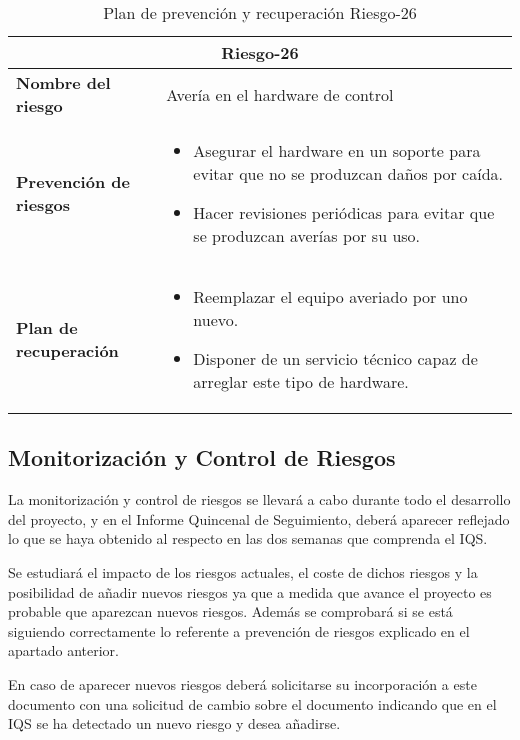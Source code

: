 \begin{table}[H]
\begin{center}
\begin{tabular}{p{} p{10cm}}
\multicolumn{2}{c}{\textbf{Riesgo-26} } \\
\hline \hline
\textbf{Nombre del riesgo} & Avería en el hardware de control \\
\hline
\textbf{Prevención de riesgos} & \begin{itemize}[-]
  \item Asegurar el hardware en un soporte para evitar que no se produzcan daños por caída.
  \item Hacer revisiones periódicas para evitar que se produzcan averías por su uso.
  \end{itemize} \\
\hline
\textbf{Plan de recuperación} &   \begin{itemize}[-]
  \item Reemplazar el equipo averiado por uno nuevo.
  \item Disponer de un servicio técnico capaz de arreglar este tipo de hardware.
  \end{itemize}\\
\hline
\end{tabular}
\caption{Plan de prevención y recuperación Riesgo-26}
\label{tab:Riesgo-26-Prev_Recup}
\end{center}
\end{table}


\subsection{Monitorización y Control de Riesgos}
\par La monitorización y control de riesgos se llevará a cabo durante todo el desarrollo del proyecto, y en el Informe Quincenal de Seguimiento, deberá aparecer reflejado lo que se haya obtenido al respecto en las dos semanas que comprenda el IQS.

Se estudiará el impacto de los riesgos actuales, el coste de dichos riesgos y la posibilidad de añadir nuevos riesgos ya que a medida que avance el proyecto es probable que aparezcan nuevos riesgos. Además se comprobará si se está siguiendo correctamente lo referente a prevención de riesgos explicado en el apartado anterior.

En caso de aparecer nuevos riesgos deberá solicitarse su incorporación a este documento con una solicitud de cambio sobre el documento indicando que en el IQS se ha detectado un nuevo riesgo y desea añadirse.

